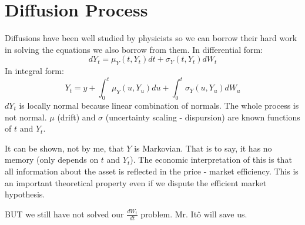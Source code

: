 
\section{Diffusion Process}

Diffusions have been well studied by physicists so we can borrow their hard
work in solving the equations we also borrow from them. In differential form:
\[dY_t=\mu_Y(t, Y_t)dt+\sigma_Y(t, Y_t)dW_t\]
In integral form:
\[Y_t=y+\int_0^t\mu_Y(u, Y_u)du+\int_0^t\sigma_Y(u,Y_u)dW_u\]
$dY_t$ is locally normal because linear combination of normals. The whole
process is not normal. $\mu$ (drift) and $\sigma$ (uncertainty scaling -
dispursion) are known functions of $t$ and $Y_t$.

It can be shown, not by me, that $Y$ is Markovian. That is to say, it has no
memory (only depends on $t$ and $Y_t$). The economic interpretation of this is
that all information about the asset is reflected in the price - market
efficiency. This is an important theoretical property even if we dispute the
efficient market hypothesis.

BUT we still have not solved our $\frac{dW_t}{dt}$ problem. Mr. It\^o will save
us.
